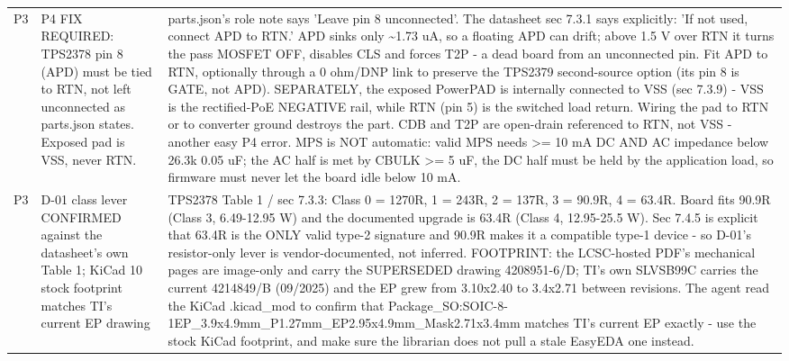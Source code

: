 \documentclass[11pt,a4paper]{article}
\begin{document}
{\begin{longtable}{lp{5.2cm}p{7.2cm}}
P3 & P4 FIX REQUIRED: TPS2378 pin 8 (APD) must be tied to RTN, not left unconnected as parts.json states. Exposed pad is VSS, never RTN. & parts.json's role note says 'Leave pin 8 unconnected'. The datasheet sec 7.3.1 says explicitly: 'If not used, connect APD to RTN.' APD sinks only \textasciitilde{}1.73 uA, so a floating APD can drift; above 1.5 V over RTN it turns the pass MOSFET OFF, disables CLS and forces T2P - a dead board from an unconnected pin. Fit APD to RTN, optionally through a 0 ohm/DNP link to preserve the TPS2379 second-source option (its pin 8 is GATE, not APD). SEPARATELY, the exposed PowerPAD is internally connected to VSS (sec 7.3.9) - VSS is the rectified-PoE NEGATIVE rail, while RTN (pin 5) is the switched load return. Wiring the pad to RTN or to converter ground destroys the part. CDB and T2P are open-drain referenced to RTN, not VSS - another easy P4 error. MPS is NOT automatic: valid MPS needs \textgreater{}= 10 mA DC AND AC impedance below 26.3k \textbar{}\textbar{} 0.05 uF; the AC half is met by CBULK \textgreater{}= 5 uF, the DC half must be held by the application load, so firmware must never let the board idle below 10 mA. \\
P3 & D-01 class lever CONFIRMED against the datasheet's own Table 1; KiCad 10 stock footprint matches TI's current EP drawing & TPS2378 Table 1 / sec 7.3.3: Class 0 = 1270R, 1 = 243R, 2 = 137R, 3 = 90.9R, 4 = 63.4R. Board fits 90.9R (Class 3, 6.49-12.95 W) and the documented upgrade is 63.4R (Class 4, 12.95-25.5 W). Sec 7.4.5 is explicit that 63.4R is the ONLY valid type-2 signature and 90.9R makes it a compatible type-1 device - so D-01's resistor-only lever is vendor-documented, not inferred. FOOTPRINT: the LCSC-hosted PDF's mechanical pages are image-only and carry the SUPERSEDED drawing 4208951-6/D; TI's own SLVSB99C carries the current 4214849/B (09/2025) and the EP grew from 3.10x2.40 to 3.4x2.71 between revisions. The agent read the KiCad .kicad\_mod to confirm that Package\_SO:SOIC-8-1EP\_3.9x4.9mm\_P1.27mm\_EP2.95x4.9mm\_Mask2.71x3.4mm matches TI's current EP exactly - use the stock KiCad footprint, and make sure the librarian does not pull a stale EasyEDA one instead. \\

\end{longtable}}
\end{document}
